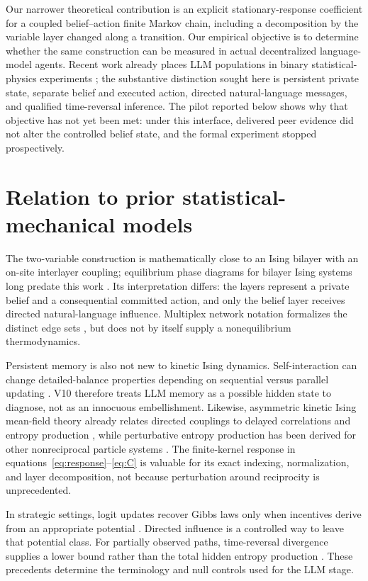 \documentclass[12pt]{article}
\begin{document}
Our narrower theoretical contribution is an explicit stationary-response
coefficient for a coupled belief--action finite Markov chain, including a
decomposition by the variable layer changed along a transition.  Our empirical
objective is to determine whether the same construction can be measured in
actual decentralized language-model agents. Recent work already places LLM
populations in binary statistical-physics experiments \cite{denobili2026}; the
substantive distinction sought here is persistent private state, separate
belief and executed action, directed natural-language messages, and qualified
time-reversal inference. The pilot reported below shows why that objective has
not yet been met: under this interface, delivered peer evidence did not alter
the controlled belief state, and the formal experiment stopped prospectively.

\section{Relation to prior statistical-mechanical models}

The two-variable construction is mathematically close to an Ising bilayer with
an on-site interlayer coupling; equilibrium phase diagrams for bilayer Ising
systems long predate this work \cite{sloutskin2007}. Its interpretation differs:
the layers represent a private belief and a consequential committed action, and
only the belief layer receives directed natural-language influence. Multiplex
network notation formalizes the distinct edge sets \cite{kivela2014}, but does
not by itself supply a nonequilibrium thermodynamics.

Persistent memory is also not new to kinetic Ising dynamics. Self-interaction
can change detailed-balance properties depending on sequential versus parallel
updating \cite{nareddy2020}. V10 therefore treats LLM memory as a possible hidden
state to diagnose, not as an innocuous embellishment. Likewise, asymmetric
kinetic Ising mean-field theory already relates directed couplings to delayed
correlations and entropy production \cite{aguilera2021}, while perturbative
entropy production has been derived for other nonreciprocal particle systems
\cite{zhang2023}. The finite-kernel response in
equations~\eqref{eq:response}--\eqref{eq:C} is valuable for its exact indexing,
normalization, and layer decomposition, not because perturbation around
reciprocity is unprecedented.

In strategic settings, logit updates recover Gibbs laws only when incentives
derive from an appropriate potential \cite{blume1993}. Directed influence is a
controlled way to leave that potential class. For partially observed paths,
time-reversal divergence supplies a lower bound rather than the total hidden
entropy production \cite{roldan2012,kawaguchi2013}. These precedents determine
the terminology and null controls used for the LLM stage.
\end{document}
